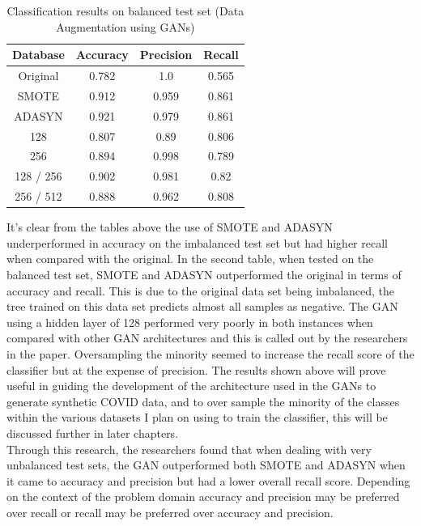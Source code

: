 \begin{table}[H]
    \centering
    \begin{tabular}{|c|c|c|c|}
         \hline
         Database
         & Accuracy
         & Precision 
         & Recall \\
         \hline
         Original & 0.782 & 1.0 & 0.565\\
         SMOTE & 0.912 & 0.959 & 0.861 \\
         ADASYN & 0.921 & 0.979 & 0.861 \\
         128 & 0.807 & 0.89 & 0.806 \\
         256 & 0.894 & 0.998 & 0.789 \\
         128 / 256 & 0.902 & 0.981 & 0.82 \\
         256 / 512 & 0.888 & 0.962 & 0.808\\
         \hline
    \end{tabular}
    \caption{Classification results on balanced test set (Data Augmentation using GANs)\cite{litReviewGanDataAugmentation}}
    \label{tab:Classification results on balanced test set (Data Augmentation using GANs)}
\end{table}
It's clear from the tables above the use of SMOTE and ADASYN underperformed in accuracy on the imbalanced test set but had higher recall when compared with the original.  In the second table, when tested on the balanced test set, SMOTE and ADASYN outperformed the original in terms of accuracy and recall. This is due to the original data set being imbalanced, the tree trained on this data set predicts almost all samples as negative. The GAN using a hidden layer of 128 performed very poorly in both instances when compared with other GAN architectures and this is called out by the researchers in the paper.  Oversampling the minority seemed to increase the recall score of the classifier but at the expense of precision.  The results shown above will prove useful in guiding the development of the architecture used in the GANs to generate synthetic COVID data, and to over sample the minority of the classes within the various datasets I plan on using to train the classifier, this will be discussed further in later chapters.
\\
Through this research, the researchers found that when dealing with very unbalanced test sets, the GAN outperformed both SMOTE and ADASYN when it came to accuracy and precision but had a lower overall recall score.  Depending on the context of the problem domain accuracy and precision may be preferred over recall or recall may be preferred over accuracy and precision.
